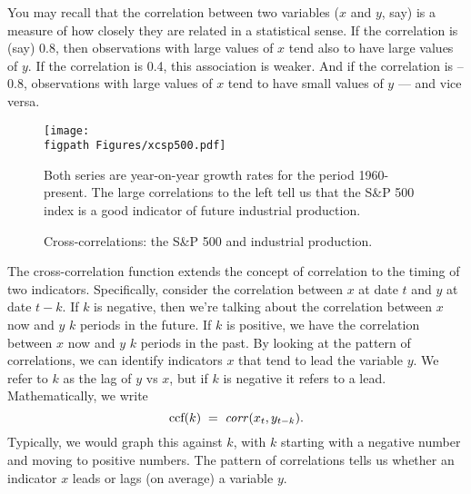 You may recall that the correlation between two variables
($x$ and $y$, say) is a measure of
how closely they are related in a statistical sense.
If the correlation is (say) 0.8,
then observations with large values of $x$
tend also to have large values of $y$.
If the correlation is 0.4, this association is weaker.
And if the correlation is --0.8,
observations with large values of $x$
tend to have small values of $y$ --- and vice versa.

\begin{figure}[!ht]
    \caption{Cross-correlations: the S\&P 500 and industrial production.}
    \label{fig:ccf-sp500}%
    \centering
    \texttt{[image: \\figpath Figures/xcsp500.pdf]}

    \begin{minipage}{0.8\textwidth}
    \footnotesize{Both series are year-on-year growth rates for the period
    1960-present.
    The large correlations to the left tell us that
    the S\&P 500 index is a good indicator of future industrial production.}
    \end{minipage}
\end{figure}

The cross-correlation function extends the concept of correlation
to the timing of two indicators.
Specifically, consider the correlation between $x$ at date $t$
and $y$ at date $t-k$.  If $k$ is negative,
then we're talking about the correlation
between $x$ now and $y$ $k$ periods in the future.
If $k$ is positive, we have the correlation between $x$ now and
$y$ $k$ periods in the past.
By looking at the pattern of correlations,
we can identify indicators $x$ that tend to lead the variable $y$.
We refer to $k$ as the lag of $y$ vs $x$,
but if $k$ is negative it refers to a lead.
Mathematically, we write
\[
    \mbox{ccf}(k) \;=\;  \mbox{\it corr\/} (x_t,y_{t-k}) .
\]
Typically, we would graph this against $k$, with $k$ starting
with a negative number and moving to positive numbers.
The pattern of correlations tells us whether an indicator $x$
leads or lags (on average) a variable $y$.


